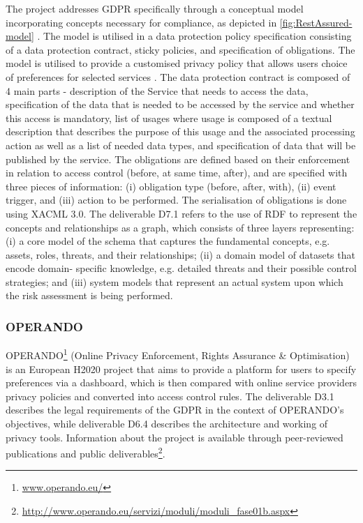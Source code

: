 The project addresses GDPR specifically through a conceptual model incorporating concepts necessary for compliance, as depicted in \autoref{fig:RestAssured-model} \cite{RestAssured_D6.1}. The model is utilised in a data protection policy specification consisting of a data protection contract, sticky policies, and specification of obligations. The model is utilised to provide a customised privacy policy that allows users choice of preferences for selected services \cite{gritzalis_privacy_2019}. The data protection contract is composed of 4 main parts - description of the Service that needs to access the data, specification of the data that is needed to be accessed by the service and whether this access is mandatory, list of usages where usage is composed of a textual description that describes the purpose of this usage and the associated processing action as well as a list of needed data types, and specification of data that will be published by the service.
The obligations are defined based on their enforcement in relation to access control (before, at same time, after), and are specified with three pieces of information: (i) obligation type (before, after, with), (ii) event trigger, and (iii) action to be performed. The serialisation of obligations is done using XACML 3.0.
The deliverable D7.1 \cite{noauthor_d7.1_2018} refers to the use of RDF to represent the concepts and relationships as a graph, which consists of three layers representing: (i) a core model of the schema that captures the fundamental concepts, e.g. assets, roles, threats, and their relationships; (ii) a domain model of datasets that encode domain- specific knowledge, e.g. detailed threats and their possible control strategies; and (iii) system models that represent an actual system upon which the risk assessment is being performed.

\subsubsection{OPERANDO}
OPERANDO\footnote{\url{www.operando.eu/}} (Online Privacy Enforcement, Rights Assurance \& Optimisation) is an European H2020 project that aims to provide a platform for users to specify preferences via a dashboard, which is then compared with online service providers privacy policies and converted into access control rules.
The deliverable D3.1 \cite{noauthor_d3.1_2016} describes the legal requirements of the GDPR in the context of OPERANDO's objectives, while deliverable D6.4 \cite{noauthor_d6.4_2017} describes the architecture and working of privacy tools.
Information about the project is available through peer-reviewed publications and public deliverables\footnote{\url{http://www.operando.eu/servizi/moduli/moduli_fase01b.aspx}}.

